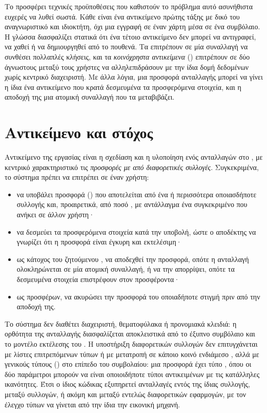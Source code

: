 Το  προσφέρει τεχνικές προϋποθέσεις που καθιστούν το πρόβλημα αυτό ασυνήθιστα
ευχερές να λυθεί σωστά. Κάθε  είναι ένα αντικείμενο πρώτης τάξης με δικό του
αναγνωριστικό και ιδιοκτήτη, όχι μια εγγραφή σε έναν χάρτη μέσα σε ένα συμβόλαιο. Η γλώσσα
 \cite{move-paper} διασφαλίζει στατικά ότι ένα τέτοιο αντικείμενο δεν μπορεί να
αντιγραφεί, να χαθεί ή να δημιουργηθεί από το πουθενά. Τα  επιτρέπουν σε μία συναλλαγή να συνθέσει πολλαπλές κλήσεις, και τα \emph{κοινόχρηστα
αντικείμενα} () επιτρέπουν σε δύο άγνωστους μεταξύ τους χρήστες να
αλληλεπιδράσουν με την ίδια δομή δεδομένων χωρίς κεντρικό διαχειριστή. Με άλλα λόγια, μια
προσφορά ανταλλαγής μπορεί να γίνει η ίδια ένα αντικείμενο που κρατά δεσμευμένα τα
προσφερόμενα στοιχεία, και η αποδοχή της μια ατομική συναλλαγή που τα μεταβιβάζει.

\section{Αντικείμενο και στόχος}
\label{sec:stoxos}

Αντικείμενο της εργασίας είναι η σχεδίαση και η υλοποίηση ενός 
ανταλλαγών στο , με κεντρικό χαρακτηριστικό τις \emph{προσφορές με  από
διαφορετικές συλλογές}. Συγκεκριμένα, το σύστημα πρέπει να επιτρέπει σε έναν χρήστη:

\begin{itemize}[nosep]
  \item να υποβάλει προσφορά () που αποτελείται από ένα ή περισσότερα 
        οποιασδήποτε συλλογής και, προαιρετικά, από ποσό , με αντάλλαγμα ένα
        συγκεκριμένο  που ανήκει σε άλλον χρήστη·
  \item να δεσμεύει τα προσφερόμενα στοιχεία κατά την υποβολή, ώστε ο αποδέκτης να γνωρίζει
        ότι η προσφορά είναι έγκυρη και εκτελέσιμη·
  \item ως κάτοχος του ζητούμενου , να αποδεχθεί την προσφορά, οπότε η ανταλλαγή
        ολοκληρώνεται σε μία ατομική συναλλαγή, ή να την απορρίψει, οπότε τα δεσμευμένα
        στοιχεία επιστρέφουν στον προσφέροντα·
  \item ως προσφέρων, να ακυρώσει την προσφορά του οποιαδήποτε στιγμή πριν από την αποδοχή της.
\end{itemize}

Το σύστημα δεν διαθέτει διαχειριστή, θεματοφύλακα ή προνομιακά κλειδιά: η ορθότητα της
ανταλλαγής διασφαλίζεται αποκλειστικά από το έξυπνο συμβόλαιο και το μοντέλο εκτέλεσης του
. Η υποστήριξη διαφορετικών συλλογών δεν επιτυγχάνεται με λίστες επιτρεπόμενων
τύπων ή με μετατροπή σε κάποιο κοινό ενδιάμεσο , αλλά με γενικούς τύπους
() στο επίπεδο του συμβολαίου: μια προσφορά έχει τύπο
, όπου οι δύο παράμετροι μπορούν να είναι οποιοιδήποτε
τύποι αντικειμένων με τις κατάλληλες ικανότητες. Έτσι ο ίδιος κώδικας εξυπηρετεί
ανταλλαγές εντός της ίδιας συλλογής, μεταξύ συλλογών, ή ακόμη και μεταξύ εντελώς
διαφορετικών εφαρμογών, με τον έλεγχο τύπων να γίνεται από την ίδια την εικονική μηχανή.

